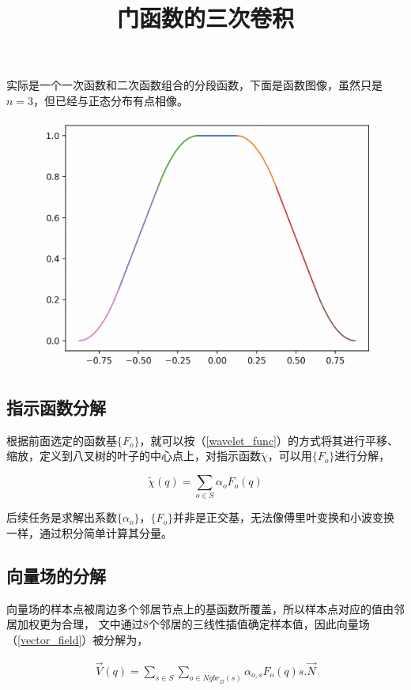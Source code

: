 			实际是一个一次函数和二次函数组合的分段函数，下面是函数图像，虽然只是$n=3$，但已经与正态分布有点相像。

			\begin{figure}[H]
				\begin{center}
					\includegraphics[scale=0.8]{../images/p_2.png}
					\title{门函数的三次卷积}
				\end{center}
			\end{figure}

	\subsection{指示函数分解}
		根据前面选定的函数基$\{F_o\}$，就可以按（\ref{wavelet_func}）的方式将其进行平移、缩放，定义到八叉树的叶子的中心点上，对指示函数$\tilde{\chi}$，可以用$\{F_o\}$进行分解，

		$$
			\tilde{\chi}(q) = \sum_{o \in S} \alpha_{o} F_o(q)
		$$

		后续任务是求解出系数$\{\alpha_{o}\}$，$\{F_o\}$并非是正交基，无法像傅里叶变换和小波变换一样，通过积分简单计算其分量。

	\subsection{向量场的分解}

		向量场的样本点被周边多个邻居节点上的基函数所覆盖，所以样本点对应的值由邻居加权更为合理， 文中通过8个邻居的三线性插值确定样本值，因此向量场（\ref{vector_field}）被分解为，

		\begin{align}
			\overrightarrow{V}(q) = \sum_{s \in S}\sum_{o \in {Ngbr}_D(s)} \alpha_{o,s}F_o(q)s.\overrightarrow{N}
		\end{align}

